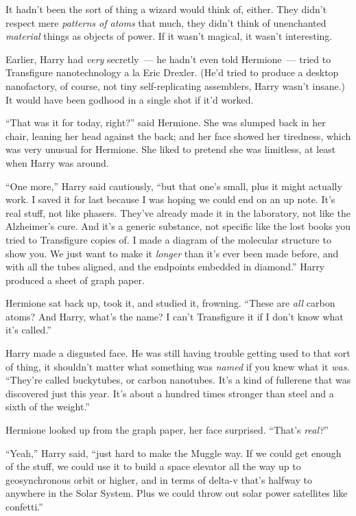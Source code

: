It hadn't been the sort of thing a wizard would think of, either. They didn't respect mere \emph{patterns of atoms} that much, they didn't think of unenchanted \emph{material} things as objects of power. If it wasn't magical, it wasn't interesting.

Earlier, Harry had \emph{very} secretly~--- he hadn't even told Hermione~--- tried to Transfigure nanotechnology a la Eric Drexler. (He'd tried to produce a desktop nanofactory, of course, not tiny self-replicating assemblers, Harry wasn't insane.) It would have been godhood in a single shot if it'd worked.

``That was it for today, right?'' said Hermione. She was slumped back in her chair, leaning her head against the back; and her face showed her tiredness, which was very unusual for Hermione. She liked to pretend she was limitless, at least when Harry was around.

``One more,'' Harry said cautiously, ``but that one's small, plus it might actually work. I saved it for last because I was hoping we could end on an up note. It's real stuff, not like phasers. They've already made it in the laboratory, not like the Alzheimer's cure. And it's a generic substance, not specific like the lost books you tried to Transfigure copies of. I made a diagram of the molecular structure to show you. We just want to make it \emph{longer} than it's ever been made before, and with all the tubes aligned, and the endpoints embedded in diamond.'' Harry produced a sheet of graph paper.

Hermione sat back up, took it, and studied it, frowning. ``These are \emph{all} carbon atoms? And Harry, what's the name? I can't Transfigure it if I don't know what it's called.''

Harry made a disgusted face. He was still having trouble getting used to that sort of thing, it shouldn't matter what something was \emph{named} if you knew what it \emph{was.} ``They're called buckytubes, or carbon nanotubes. It's a kind of fullerene that was discovered just this year. It's about a hundred times stronger than steel and a sixth of the weight.''

Hermione looked up from the graph paper, her face surprised. ``That's \emph{real?}''

``Yeah,'' Harry said, ``just hard to make the Muggle way. If we could get enough of the stuff, we could use it to build a space elevator all the way up to geosynchronous orbit or higher, and in terms of delta-v that's halfway to anywhere in the Solar System. Plus we could throw out solar power satellites like confetti.''


